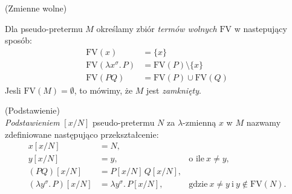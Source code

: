\begin{definicja}(Zmienne wolne)
  \item Dla pseudo-pretermu \(M\) określamy zbiór \emph{termów wolnych} \(\mathrm{FV}\) w nastepujący sposób:
    \begin{align*}
      \mathrm{FV}(x) &= \{x\}\\
      \mathrm{FV}(\lambda x^\sigma .\, P)  &= \mathrm{FV}(P)\setminus\{x\}\\
      \mathrm{FV}(P Q) &= \mathrm{FV}(P)\cup\mathrm{FV}(Q)
    \end{align*}
Jesli \(\mathrm{FV}(M)=\emptyset\), to mówimy, że \(M\) jest \emph{zamknięty}.
\end{definicja}

\begin{definicja}(Podstawienie)\\
\emph{Podstawieniem} \([x/N]\) pseudo-pretermu \(N\) za \(\lambda\)-zmienną \(x\) w \(M\) nazwamy zdefiniowane następująco przekształcenie:
  \begin{align*}
    x[x/N] &= N,\\
    y[x/N] &= y,\ &\text{o ile}\ x\neq y,\\
    (PQ)[x/N] &= P[x/N]\,Q[x/N],\\
    (\lambda y^\sigma.\, P)[x/N] &= \lambda y^\sigma .\,P[x/N],\ &\text{gdzie}\ x\neq y\ \text{i}\ y\not\in \mathrm{FV}(N).\\
  \end{align*}
\end{definicja}

